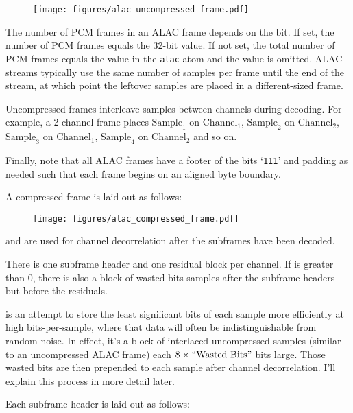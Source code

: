\begin{figure}[h]
\texttt{[image: figures/alac\_uncompressed\_frame.pdf]}
\end{figure}
\par
\noindent
The number of PCM frames in an ALAC frame depends on the 
bit.
If set, the number of PCM frames equals the 32-bit 
value.
If not set, the total number of PCM frames equals the 
value in the \texttt{alac} atom and the  value is omitted.
ALAC streams typically use the same number of samples per frame
until the end of the stream, at which point the leftover samples
are placed in a different-sized frame.

Uncompressed frames interleave samples between channels during decoding.
For example, a 2 channel frame places $\text{Sample}_1$ on $\text{Channel}_1$,
$\text{Sample}_2$ on $\text{Channel}_2$,
$\text{Sample}_3$ on $\text{Channel}_1$,
$\text{Sample}_4$ on $\text{Channel}_2$ and so on.

Finally, note that all ALAC frames have a footer of the bits `\texttt{111}'
and padding as needed such that each frame begins on an aligned byte boundary.

\pagebreak

A compressed frame is laid out as follows:

\begin{figure}[h]
\texttt{[image: figures/alac\_compressed\_frame.pdf]}
\end{figure}
\par
\noindent
{} and  are used
for channel decorrelation after the subframes have been decoded.

There is one subframe header and one residual block per
channel.
If  is greater than 0, there is also
a block of wasted bits samples after the subframe headers but before
the residuals.

 is an attempt to store the least significant bits
of each sample more efficiently at high bits-per-sample, where
that data will often be indistinguishable from random noise.
In effect, it's a block of interlaced uncompressed samples
(similar to an uncompressed ALAC frame) each $8 \times \text{``{Wasted Bits}''}$
bits large.
Those wasted bits are then prepended to each sample after channel
decorrelation.
I'll explain this process in more detail later.

Each subframe header is laid out as follows:

